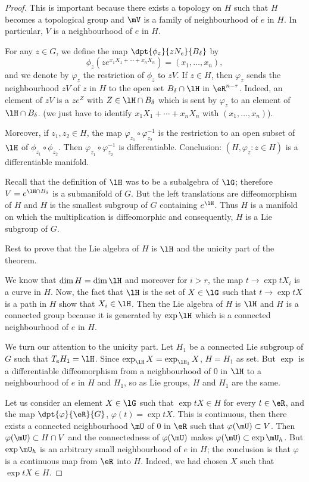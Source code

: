 \begin{proof}
This is important because there exists a topology on $H$ such that $H$ becomes a topological group and $\mV$ is a family of neighbourhood of $e$ in $H$. In particular, $V$ is a neighbourhood of $e$ in $H$.

For any $z\in G$, we define the map $\dpt{\phi_z}{zN_e}{B_{\delta}}$ by
\begin{equation}
  \phi_z(ze^{x_1X_1+\cdots+x_nX_n})=(x_1,\ldots,x_n),
\end{equation}
and we denote by $\varphi_z$ the restriction of $\phi_z$ to $zV$. If $z\in H$, then $\varphi_z$ sends the neighbourhood $zV$ of $z$ in $H$ to the open set $B_{\delta}\cap\lH$ in $\eR^{n-r}$. Indeed, an element of $zV$ is a $ze^Z$ with $Z\in\lH\cap B_{\delta}$ which is sent by $\varphi_z$ to an element of $\lH\cap B_{\delta}$. (we just have to identify $x_1X_1+\cdots+x_nX_n$ with $(x_1,\ldots,x_n)$).

Moreover, if $z_1,z_2\in H$, the map $\varphi_{z_1}\circ\varphi_{z_2}^{-1}$ is the restriction to an open subset of $\lH$ of $\phi_{z_1}\circ\phi_{z_2}$. Then $\varphi_{z_1}\circ\varphi_{z_2}^{-1}$ is differentiable. Conclusion: $(H,\varphi_z: z\in H)$ is a differentiable manifold.

Recall that the definition of $\lH$ was to be a subalgebra of $\lG$; therefore $V=e^{\lH\cap B_{\delta}}$ is a submanifold of $G$. But the left translations are diffeomorphism of $H$ and $H$ is the smallest subgroup of $G$ containing $e^{\lH}$. Thus $H$ is a manifold on which the multiplication is diffeomorphic and consequently, $H$ is a Lie subgroup of $G$.

Rest to prove that the Lie algebra of $H$ is $\lH$ and the unicity part of the theorem.

We know that $\dim H=\dim\lH$ and moreover for $i>r$, the map $t\to\exp tX_i$ is a curve in $H$. Now, the fact that $\lH$ is the set of $X\in\lG$ such that $t\to\exp tX$ is a path in $H$ show that $X_i\in\lH$. Then the Lie algebra of $H$ is $\lH$ and $H$ is a connected group because it is generated by $\exp\lH$ which is a connected neighbourhood of $e$ in $H$.

We turn our attention to the unicity part. Let $H_1$ be a connected Lie subgroup of $G$ such that $T_eH_1=\lH$. Since $\exp_{\lH}X=\exp_{\lH_1}X$, $H=H_1$ as set. But $\exp$ is a differentiable diffeomorphism from a neighbourhood of $0$ in $\lH$ to a neighbourhood of $e$ in $H$ and $H_1$, so as Lie groups, $H$ and $H_1$ are the same.

Let us consider an element $X\in\lG$ such that $\exp tX\in H$ for every $t\in\eR$, and the map $\dpt{\varphi}{\eR}{G}$, $\varphi(t)=\exp tX$. This is continuous, then there exists a connected neighbourhood $\mU$ of $0$ in $\eR$ such that $\varphi(\mU)\subset V$. Then $\varphi(\mU)\subset H\cap V$ and the connectedness of $\varphi(\mU)$ makes $\varphi(\mU)\subset\exp\mU_h$. But $\exp\mU_h$ is an arbitrary small neighbourhood of $e$ in $H$; the conclusion is that $\varphi$ is a continuous map from $\eR$ into $H$. Indeed, we had chosen $X$ such that $\exp tX\in H$.


\end{proof}
